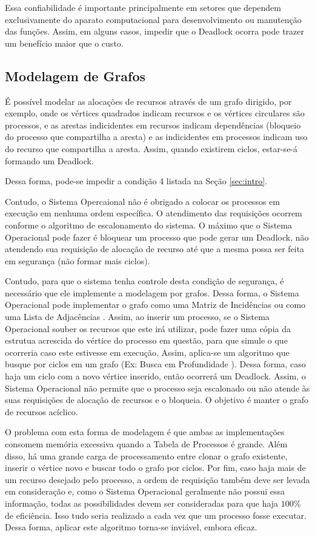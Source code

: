 	Essa confiabilidade é importante principalmente em setores que dependem exclusivamente do aparato computacional para desenvolvimento ou manutenção das funções. Assim, em alguns casos, impedir que o Deadlock ocorra pode trazer um benefício maior que o custo.

	\subsection{Modelagem de Grafos}\label{sec:grafos}
	É possível modelar as alocações de recursos através de um grafo dirigido, por exemplo, onde os vértices quadrados indicam recursos e os vértices circulares são processos, e as arestas indicidentes em recursos indicam dependências (bloqueio do processo que compartilha a aresta) e as indicidentes em processos indicam uso do recurso que compartilha a aresta. Assim, quando existirem ciclos, estar-se-á formando um Deadlock.

	Dessa forma, pode-se impedir a condição 4 listada na Seção \ref{sec:intro}.

	Contudo, o Sistema Opercaional não é obrigado a colocar os processos em execução em nenhuma ordem específica. O atendimento das requisições ocorrem conforme o algoritmo de escalonamento do sistema. O máximo que o Sistema Operacional pode fazer é bloquear um processo que pode gerar um Deadlock, não atendendo sua requisição de alocação de recurso até que a mesma possa ser feita em segurança (não formar mais ciclos).

	Contudo, para que o sistema tenha controle desta condição de segurança, é necessário que ele implemente a modelagem por grafos. Dessa forma, o Sistema Operacional pode implementar o grafo como uma Matriz de Incidências \cite{matin}	ou como uma Lista de Adjacências \cite{listadj}.	Assim, ao inserir um processo, se o Sistema Operacional souber os recursos que este irá utilizar, pode fazer uma cópia da estrutua acrescida do vértice do processo em questão, para que simule o que ocorreria caso este estivesse em execução. Assim, aplica-se um algoritmo que busque por ciclos em um grafo (Ex: Busca em Profundidade \cite{grafufmg}). Dessa forma, caso haja um ciclo com a novo vértice inserido, então ocorrerá um Deadlock. Assim, o Sistema Operacional não permite que o processo seja escalonado ou não atende às suas requisições de alocação de recursos e o bloqueia. O objetivo é manter o grafo de recursos acíclico.

	O problema com esta forma de modelagem é que ambas as implementações consomem memória excessiva quando a Tabela de Processos é grande. Além disso, há uma grande carga de processamento entre clonar o grafo existente, inserir o vértice novo e buscar todo o grafo por ciclos. Por fim, caso haja mais de um recurso desejado pelo processo, a ordem de requisição também deve ser levada em consideração e, como o Sistema Operacional geralmente não possui essa informação, todas as possibilidades devem ser consideradas para que haja $100\%$ de eficiência. Isso tudo seria realizado a cada vez que um processo fosse executar. Dessa forma, aplicar este algoritmo torna-se inviável, embora eficaz.

